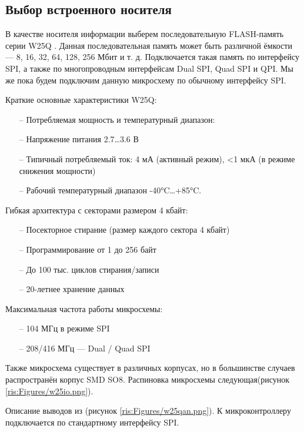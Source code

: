 \begin{sloppypar} %


\subsection{Выбор встроенного носителя}
 В качестве носителя информации выберем последовательную FLASH-память серии W25Q \cite{W25Q}. Данная последовательная память может быть различной ёмкости — 8, 16, 32, 64, 128, 256 Мбит и т. д. Подключается такая память по интерфейсу SPI, а также по многопроводным интерфейсам Dual SPI, Quad SPI и QPI. Мы же пока будем подключим данную микросхему по обычному интерфейсу SPI.

Краткие основные характеристики W25Q:

\begin{onehalfspace}
	\begin{itemize}
		\item[--]Потребляемая мощность и температурный диапазон:
		\item[--]Напряжение питания 2.7…3.6 В
		\item[--]Типичный потребляемый ток: 4 мА (активный режим), <1 мкА (в режиме снижения мощности)
		\item[--]Рабочий температурный диапазон -40°C…+85°C.
	\end{itemize}
\end{onehalfspace}

Гибкая архитектура с секторами размером 4 кбайт:
\begin{onehalfspace}
	\begin{itemize}
		\item[--]Посекторное стирание (размер каждого сектора 4 кбайт)
		\item[--]Программирование от 1 до 256 байт
		\item[--]До 100 тыс. циклов стирания/записи
		\item[--] 20-летнее хранение данных
	\end{itemize}
\end{onehalfspace}


Максимальная частота работы микросхемы:
\begin{onehalfspace}
	\begin{itemize}
		\item[--]104 МГц в режиме SPI
		\item[--]208/416 МГц — Dual / Quad SPI
	\end{itemize}
\end{onehalfspace}

Также микросхема существует в различных корпусах, но в большинстве случаев распространён корпус SMD SO8. Распиновка микросхемы следующая(рисунок \ref{ris:Figures/w25io.png}).

Описание выводов из  \cite {W25Q}(рисунок \ref{ris:Figures/w25qan.png}).
К микроконтроллеру подключается по стандартному интерфейсу SPI.



\end{sloppypar}
